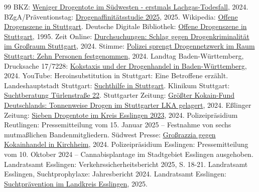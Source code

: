 \documentclass[11pt,a4paper]{article}
\begin{document}
\begin{thebibliography}{99}
		 BKZ: \href{https://www.bkz.de/nachrichten/weniger-drogentote-im-suedwesten-erstmals-lachgas-todesfall-234659.html}{Weniger Drogentote im Südwesten - erstmals Lachgas-Todesfall}, 2024.
		 BZgA/Präventionstag: \href{https://www.praeventionstag.de}{Drogenaffinitätsstudie 2025}, 2025.
		 Wikipedia: \href{http://web.archive.org/web/20060913000000/http://de.wikipedia.org:80/wiki/Drogenszene}{Offene Drogenszene in Stuttgart}.
		 Deutsche Digitale Bibliothek: \href{https://www.deutsche-digitale-bibliothek.de/item/UC5HIVCN7D2OED4JWS3CDTR4AS7UKAFW}{Offene Drogenszene in Stuttgart}, 1995.
		 Zeit Online: \href{https://www.zeit.de/news/2024-09/16/durchsuchungen-schlag-gegen-drogenkriminalitaet-im-grossraum-stuttgart}{Durchsuchungen: Schlag gegen Drogenkriminalität im Großraum Stuttgart}, 2024.
		 Stimme: \href{https://www.stimme.de/deutschland-welt/polizei-sprengt-drogennetzwerk-im-raum-stuttgart-zehn-personen-festgenommen-51882359.html}{Polizei sprengt Drogennetzwerk im Raum Stuttgart: Zehn Personen festgenommen}, 2024.
		 Landtag Baden-Württemberg, Drucksache 17/7228: \href{https://www.landtag-bw.de/resource/blob/267420/8434cfbd4572d13f974635de860859b8/17_7228_D.pdf}{Kokstaxis und der Drogenhandel in Baden-Württemberg}, 2024.
		 YouTube: Heroinsubstitution in Stuttgart: Eine Betroffene erzählt.
		 Landeshauptstadt Stuttgart: \href{https://www.stuttgart.de}{Suchthilfe in Stuttgart}.
		 Klinikum Stuttgart: \href{https://www.klinikum-stuttgart.de/sucht}{Suchtberatung Türlenstraße 22}.
		 Stuttgarter Zeitung: \href{https://www.stuttgarter-zeitung.de/inhalt.riesiger-kokainfund-tonnenweise-drogen-im-stuttgarter-lka.48cd2e57-7f17-490e-89a8-b0fc6697426c.html}{Größter Kokain-Fund Deutschlands: Tonnenweise Drogen im Stuttgarter LKA gelagert}, 2024.
		 Eßlinger Zeitung: \href{https://www.esslinger-zeitung.de}{Sieben Drogentote im Kreis Esslingen 2023}, 2024.
		 Polizeipräsidium Reutlingen: Pressemitteilung vom 15. Januar 2025 – Festnahme von sechs mutmaßlichen Bandenmitgliedern.
		 Südwest Presse: \href{https://www.swp.de}{Großrazzia gegen Kokainhandel in Kirchheim}, 2024.
		 Polizeipräsidium Esslingen: Pressemitteilung vom 10. Oktober 2024 – Cannabisplantage im Stadtgebiet Esslingen ausgehoben.
		 Landratsamt Esslingen: Verkehrssicherheitsbericht 2025, S. 18-21.
		 Landratsamt Esslingen, Suchtprophylaxe: Jahresbericht 2024.
		 Landratsamt Esslingen: \href{https://www.landkreis-esslingen.de/site/LRA-ES-Internet-2023/node/19421567}{Suchtprävention im Landkreis Esslingen}, 2025.
	\end{thebibliography}
\end{document}

